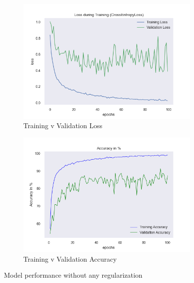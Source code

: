 \documentclass[a4paper]{article}
\begin{document}
\begin{figure}[H]
\centering
\begin{subfigure}{0.5\textwidth}
  \centering
  \includegraphics[width=1\linewidth]{img/baptiste/baptiste_100epoches_val_loss__Dropouts_False__BatchNorm_False.png}
  \caption{Training v Validation Loss}
  \label{fig:sub1}
\end{subfigure}%
\begin{subfigure}{0.5\textwidth}
  \centering
  \includegraphics[width=1\linewidth]{img/baptiste/baptiste_100epoches_train_accuracy__Dropouts_False__BatchNorm_False.png}
  \caption{Training v Validation Accuracy}
  \label{fig:sub2}
\end{subfigure}
\caption{Model performance without any regularization}
\label{fig:test}
\end{figure}
\end{document}
